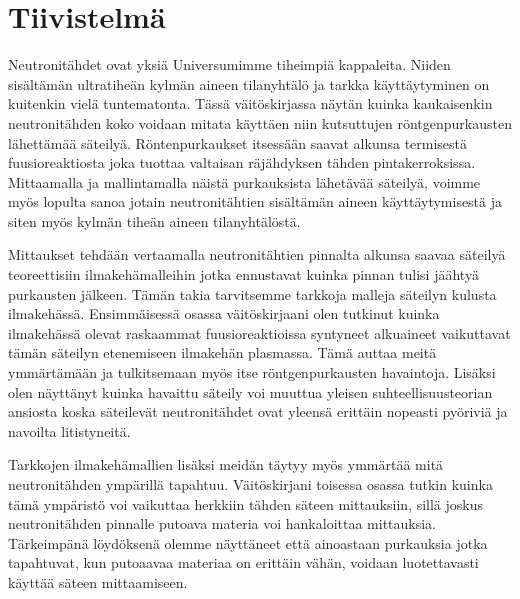 


\vspace{2.0cm}
\chapter*{Tiivistelmä}

Neutronitähdet ovat yksiä Universumimme tiheimpiä kappaleita.
Niiden sisältämän ultratiheän kylmän aineen tilanyhtälö ja tarkka käyttäytyminen on kuitenkin vielä tuntematonta.
Tässä väitöskirjassa näytän kuinka kaukaisenkin neutronitähden koko voidaan mitata käyttäen niin kutsuttujen röntgenpurkausten lähettämää säteilyä.
Röntenpurkaukset itsessään saavat alkunsa termisestä fuusioreaktiosta joka tuottaa valtaisan räjähdyksen tähden pintakerroksissa.
Mittaamalla ja mallintamalla näistä purkauksista lähetävää säteilyä, voimme myös lopulta sanoa jotain neutronitähtien sisältämän aineen käyttäytymisestä ja siten myös kylmän tiheän aineen tilanyhtälöstä.

Mittaukset tehdään vertaamalla neutronitähtien pinnalta alkunsa saavaa säteilyä teoreettisiin ilmakehämalleihin jotka ennustavat kuinka pinnan tulisi jäähtyä purkausten jälkeen.
Tämän takia tarvitsemme tarkkoja malleja säteilyn kulusta ilmakehässä.
Ensimmäisessä osassa väitöskirjaani olen tutkinut kuinka ilmakehässä olevat raskaammat fuusioreaktioissa syntyneet alkuaineet vaikuttavat tämän säteilyn etenemiseen ilmakehän plasmassa.
Tämä auttaa meitä ymmärtämään ja tulkitsemaan myös itse röntgenpurkausten havaintoja.
Lisäksi olen näyttänyt kuinka havaittu säteily voi muuttua yleisen suhteellisuusteorian ansiosta koska säteilevät neutronitähdet ovat yleensä erittäin nopeasti pyöriviä ja navoilta litistyneitä.

Tarkkojen ilmakehämallien lisäksi meidän täytyy myös ymmärtää mitä neutronitähden ympärillä tapahtuu.
Väitöskirjani toisessa osassa tutkin kuinka tämä ympäristö voi vaikuttaa herkkiin tähden säteen mittauksiin, sillä joskus neutronitähden pinnalle putoava materia voi hankaloittaa mittauksia.
Tärkeimpänä löydöksenä olemme näyttäneet että ainoastaan purkauksia jotka tapahtuvat, kun putoaavaa materiaa on erittäin vähän, voidaan luotettavasti käyttää säteen mittaamiseen.

